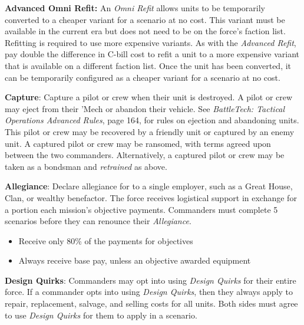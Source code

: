 \item {\bfseries Advanced Omni Refit:} An \emph{Omni Refit} allows units to be temporarily converted to a cheaper variant for a scenario at no cost.
This variant must be available in the current era but does not need to be on the force's faction list.
Refitting is required to use more expensive variants.
As with the \emph{Advanced Refit}, pay double the difference in C-bill cost to refit a unit to a more expensive variant that is available on a different faction list.
Once the unit has been converted, it can be temporarily configured as a cheaper variant for a scenario at no cost.

\item {\bfseries Capture}: Capture a pilot or crew when their unit is destroyed.
A pilot or crew may eject from their 'Mech or abandon their vehicle.
See \emph{BattleTech: Tactical Operations Advanced Rules}, page 164, for rules on ejection and abandoning units.
This pilot or crew may be recovered by a friendly unit or captured by an enemy unit.
A captured pilot or crew may be ransomed, with terms agreed upon between the two commanders.
Alternatively, a captured pilot or crew may be taken as a bondsman and \emph{retrained} as above.

\item {\bfseries Allegiance}: Declare allegiance for to a single employer, such as a Great House, Clan, or wealthy benefactor.
The force receives logistical support in exchange for a portion each mission's objective payments.
Commanders must complete 5 scenarios before they can renounce their \emph{Allegiance}.

\begin{itemize}

\item Receive only 80\% of the payments for objectives

\item Always receive base pay, unless an objective awarded equipment

\end{itemize}

\pagebreak

\item {\bfseries Design Quirks}: Commanders may opt into using \emph{Design Quirks} for their entire force.
If a commander opts into using \emph{Design Quirks}, then they always apply to repair, replacement, salvage, and selling costs for all units.
Both sides must agree to use \emph{Design Quirks} for them to apply in a scenario.

